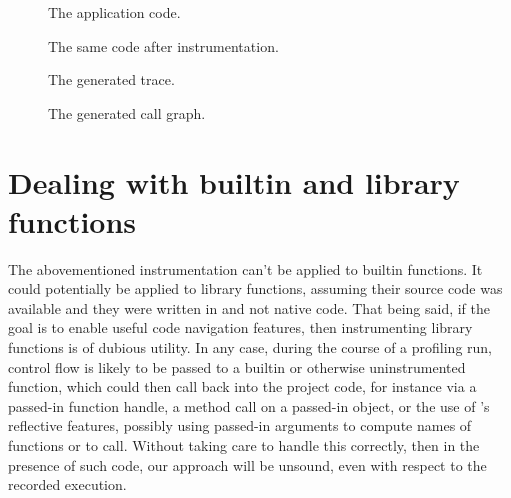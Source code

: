 
\begin{figure}[htbp]
\begin{minipage}{\linewidth}
  
\end{minipage}
\begin{minipage}{\linewidth}
  
\end{minipage}
\caption{The application code.}
\label{Fig:CallgraphBefore}
\end{figure}

\begin{figure}[htbp]
\begin{minipage}{\linewidth}
  
\end{minipage}
\begin{minipage}{\linewidth}
  
\end{minipage}
\caption{The same code after instrumentation.}
\label{Fig:CallgraphAfter}
\end{figure}

\begin{figure}[htbp]

\caption{The generated trace.}
\label{Fig:CallgraphTrace}
\end{figure}

\begin{figure}[htbp]

\caption{The generated call graph.}
\label{Fig:Callgraph}
\end{figure}

\section{Dealing with builtin and library functions}

The abovementioned instrumentation can't be applied to \matlab builtin
functions. It could potentially be applied to library functions, assuming their
source code was available and they were written in \matlab and not native code.
That being said, if the goal is to enable useful code navigation features, then
instrumenting library functions is of dubious utility. In any case, during the
course of a profiling run, control flow is likely to be passed to a builtin or
otherwise uninstrumented function, which could then call back into the project
code, for instance via a passed-in function handle, a method call on a
passed-in object, or the use of \matlab's reflective features, possibly using
passed-in arguments to compute names of functions or to call. Without taking
care to handle this correctly, then in the presence of such code, our approach
will be unsound, even with respect to the recorded execution.

